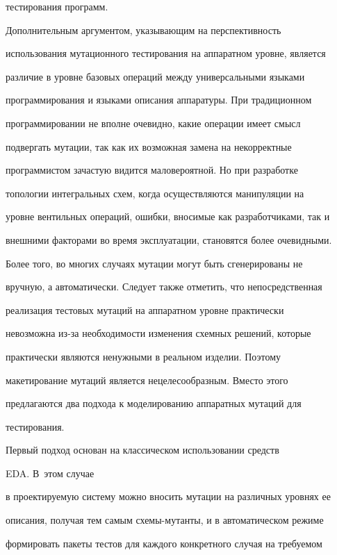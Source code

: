 тестирования программ.





    Дополнительным аргументом, указывающим на перспективность


использования мутационного тестирования на аппаратном уровне, является


различие в уровне базовых операций между универсальными языками


программирования и языками описания аппаратуры. При традиционном


программировании не вполне очевидно, какие операции имеет смысл


подвергать мутации, так как их возможная замена на некорректные


программистом зачастую видится маловероятной. Но при разработке


топологии интегральных схем, когда осуществляются манипуляции на


уровне вентильных операций, ошибки, вносимые как разработчиками, так и


внешними факторами во время эксплуатации, становятся более очевидными.


Более того, во многих случаях мутации могут быть сгенерированы не


вручную, а автоматически. Следует также отметить, что непосредственная


реализация тестовых мутаций на аппаратном уровне практически


невозможна из-за необходимости изменения схемных решений, которые


практически являются ненужными в реальном изделии. Поэтому


макетирование мутаций является нецелесообразным. Вместо этого


предлагаются два подхода к моделированию аппаратных мутаций для


тестирования.





    Первый подход основан на классическом использовании средств


EDA. В~этом случае


в про\-ек\-ти\-ру\-емую систему можно вносить мутации на различных уровнях ее


описания, получая тем самым схемы-мутанты, и в автоматическом режиме


формировать пакеты тес\-тов для каждого конкретного случая на требуемом


